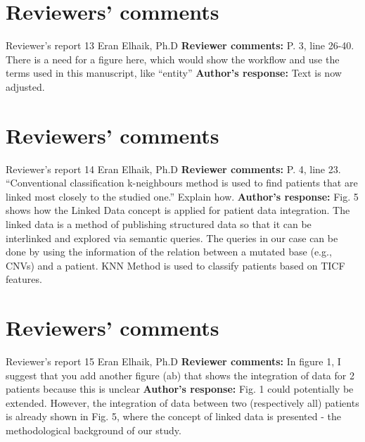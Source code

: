 \documentclass{bmcart}
\begin{document}
\begin{backmatter}
\section*{Reviewers' comments}
\newline Reviewer's report 13
\newline Eran Elhaik, Ph.D
\newline \textbf{Reviewer comments:}
P. 3, line 26-40. There is a need for a figure here, which would show the workflow and use the terms used in this manuscript, like “entity”
\newline \textbf{Author's response:}
Text is now adjusted.

\section*{Reviewers' comments}
\newline Reviewer's report 14
\newline Eran Elhaik, Ph.D
\newline \textbf{Reviewer comments:}
 P. 4, line 23. “Conventional classification k-neighbours method is used to find patients that are linked most closely to the studied one.” Explain how.
\newline \textbf{Author's response:}
Fig. 5 shows how the Linked Data concept is applied for patient data integration. The linked data is a method of publishing structured data so that it can be interlinked and explored via semantic queries. The queries in our case can be done by using the information of the relation between a mutated base (e.g., CNVs) and a patient.
KNN Method is used to classify patients based on TICF features.

\section*{Reviewers' comments}
\newline Reviewer's report 15
\newline Eran Elhaik, Ph.D
\newline \textbf{Reviewer comments:}
In figure 1, I suggest that you add another figure (ab) that shows the integration of data for 2 patients because this is unclear
\newline \textbf{Author's response:}
Fig. 1 could potentially be extended. However, the integration of data between two (respectively all) patients is already shown in Fig. 5, where the concept of linked data is presented - the methodological background of our study.


\end{backmatter}
\end{document}

